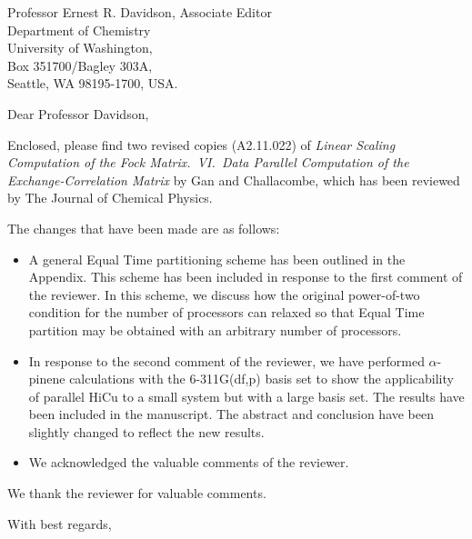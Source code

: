 
\pagestyle{empty}

\signature{Matt Challacombe}

\address{
Dr.~Matt Challacombe \\
(mchalla@lanl.gov) \\
Theoretical Division \\
Group T-12, MS B268 \\
Los Alamos National Laboratory \\
Los Alamos, NM 87545 }

\begin{letter}{
Professor Ernest R. Davidson, Associate Editor\\
Department of Chemistry\\
University of Washington,\\
Box 351700/Bagley 303A,\\
Seattle, WA 98195-1700, USA.
}

\opening{Dear Professor Davidson,}

Enclosed, please find two revised copies (A2.11.022) of 
{\em Linear Scaling Computation of the Fock Matrix.~VI.~Data 
Parallel Computation 
of the Exchange-Correlation Matrix} by Gan and Challacombe, which has been
reviewed by The Journal of Chemical Physics.

The changes that have been made are as follows:
\pagebreak

\begin{itemize}
\item A general Equal Time partitioning scheme has been 
outlined in the Appendix. This scheme has been included in response to
the first comment of the reviewer. In this scheme, we discuss how the original
power-of-two condition for the number of processors 
can relaxed so that Equal Time partition may be obtained with
an arbitrary number of processors.

\item In response to the second comment of the reviewer,
we have performed $\alpha$-pinene calculations with the 6-311G(df,p) basis
set to show the applicability of parallel HiCu to a small system but with
a large basis set. The results have been included in the manuscript. 
The abstract and conclusion have been slightly changed to reflect 
the new results. 

\item We acknowledged the valuable comments of the reviewer.

\end{itemize}

We thank the reviewer for valuable comments.

\closing{With best regards,}
\end{letter}


